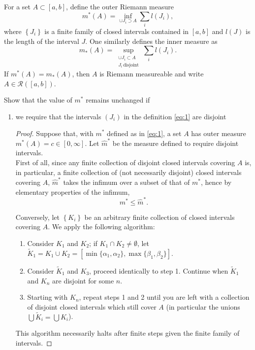 \documentclass[12pt]{article}
\newenvironment{problem}[2][Problem]{\begin{trivlist}
    \item[\hskip \labelsep {\bfseries #1}\hskip \labelsep {\bfseries #2.}]}{\end{trivlist}}
\theoremstyle{definition}
\begin{document}
For a set \( A \subset [a,b] \), define the outer Riemann measure
\begin{equation}
\label{eq:1}
m^{*}(A) = \inf_{\cup J_i \supset A} \sum\limits_i l(J_i),
\end{equation}
where \( \left\{ J_i \right\} \) is a finite family of closed intervals contained in \( [a,b] \) and \( l(J) \) is the length of the interval \( J \).
One similarly defines the inner measure as
\begin{equation}
\label{eq:2}
m_{*}(A) = \sup_{\substack{\cup J_i \subset A \\ J_i \, \text{disjoint}}} \sum\limits_i l(J_i).
\end{equation}
If \( m^{*}(A) = m_{*}(A) \), then \( A \) is Riemann measureable and write \( A \in \mathcal{R}([a,b]) \).

\begin{problem}{1}
  Show that the value of \( m^{*} \) remains unchanged if
  \begin{enumerate}[label=(\roman*)]
    \item we require that the intervals \( (J_i) \) in the definition \cref{eq:1} are disjoint
          \begin{proof}
            Suppose that, with \( m^{*} \) defined as in \cref{eq:1}, a set \( A \) has outer measure \( m^{*}(A) = c \in [0, \infty] \).
            Let \( \hat{m}^{*}\) be the measure defined to require disjoint intervals.\\

            First of all, since any finite collection of disjoint closed intervals covering \( A \) is, in particular, a finite collection of (not necessarily disjoint) closed intervals covering \( A \), \( \hat{m}^{*} \) takes the infimum over a subset of that of \( m^{*} \), hence by elementary properties of the infimum,
            \begin{equation}
            \label{eq:6}
            m^{*} \leq \hat{m}^{*}.
            \end{equation}

            Conversely, let \( \left\{ K_i \right\} \) be an arbitrary finite collection of closed intervals covering \( A \).
            We apply the following algorithm:
            \begin{enumerate}[label=(\arabic*)]
              \item Consider \( K_1 \) and \( K_2 \); if \( K_1 \cap K_2 \neq \emptyset \), let \( \tilde{K}_1 = K_1 \cup K_{2} = [\min\{\alpha_1, \alpha_2\}, \max\{\beta_1, \beta_2\}] \).
              \item Consider \( \tilde{K}_1\) and \(K_3 \), proceed identically to step 1. Continue when \( \tilde{K}_1 \) and \( K_n \) are disjoint for some \( n \).
              \item Starting with \( K_n \), repeat steps 1 and 2 until you are left with a collection of disjoint closed intervals which still cover \( A \) (in particular the unions \( \bigcup  \tilde{K}_{i}  = \bigcup  K_i  \)).
            \end{enumerate}
            This algorithm necessarily halts after finite steps given the finite family of intervals.


\end{proof}
\end{enumerate}
\end{problem}
\end{document}
